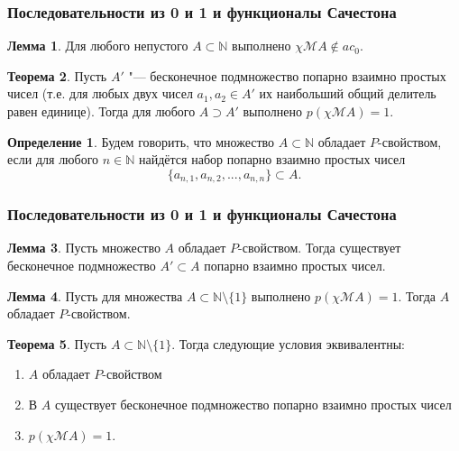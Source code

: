 \documentclass[10pt,pdf,hyperref={unicode},aspectratio=169,color={usenames, dvipsnames}]{beamer}\usepackage{amsmath}
\theoremstyle{definition}
\newtheorem{llemma}{Лемма}
\newtheorem{ttheorem}[llemma]{Теорема}
\newtheorem{ddefinition}{Определение}[llemma]
\begin{document}
\begin{frame}
	\frametitle{Последовательности из 0 и 1 и функционалы Сачестона}

	\begin{llemma}
		Для любого непустого $A\subset \mathbb{N} $ выполнено $\chi\mathscr{M}A \notin ac_0$.
	\end{llemma}

	\begin{ttheorem}
		\label{lem:ac0_primes_infinity_mutually_prime_subset}
		Пусть $A'$ "--- бесконечное подмножество попарно взаимно простых чисел
		(т.е. для любых двух чисел $a_1, a_2 \in A'$ их наибольший общий делитель равен единице).
		Тогда для любого $A \supset A' $ выполнено $p(\chi\mathscr{M}A)=1$.
	\end{ttheorem}
	\begin{ddefinition}
		Будем говорить, что множество $A\subset\mathbb{N}$ обладает $P$-свойством,
		если для любого $n\in\mathbb{N}$ найдётся набор попарно взаимно простых чисел
		\begin{equation}
			\{a_{n,1}, a_{n,2}, ..., a_{n,n}  \} \subset A
			.
		\end{equation}
	\end{ddefinition}
\end{frame}

\begin{frame}
	\frametitle{Последовательности из 0 и 1 и функционалы Сачестона}

	\begin{llemma}
		\label{lem:ac0_primes_infinity_mutually_prime_subset_equiv_to_P_property}
		Пусть множество $A$ обладает $P$-свойством.
		Тогда существует бесконечное подмножество $A'\subset A$ попарно взаимно простых чисел.
	\end{llemma}
	\begin{llemma}
		\label{lem:ac0_primes_q_psi_A_0_causes_P}
		Пусть для множества $A\subset\mathbb{N}\setminus\{1\}$ выполнено $p(\chi\mathscr{M}A)=1$.
		Тогда $A$ обладает $P$-свойством.
	\end{llemma}
	\begin{ttheorem}
		Пусть $A\subset \mathbb{N}\setminus\{1\}$.
		Тогда следующие условия эквивалентны:
		\begin{enumerate}
			\item
				$A$ обладает $P$-свойством
			\item
				В $A$ существует бесконечное подмножество попарно взаимно простых чисел
			\item
				$p(\chi\mathscr{M}A)=1$.
		\end{enumerate}
	\end{ttheorem}
\end{frame}
\end{document}
